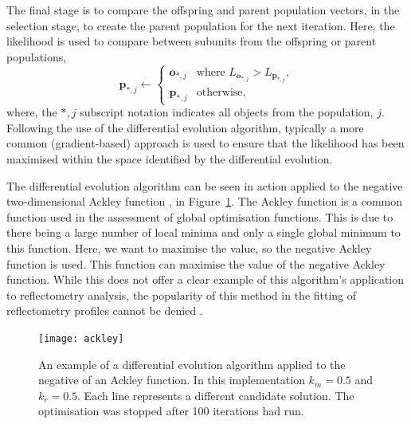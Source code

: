 \documentclass[
 reprint,
 superscriptaddress,
 amsmath,amssymb,
 aps,
]{revtex4-1}
\begin{document}
The final stage is to compare the offspring and parent population vectors, in the selection stage, to create the parent population for the next iteration.
Here, the likelihood is used to compare between subunits from the offspring or parent populations,
%
\begin{equation}
    \mathbf{p}_{*, j} \leftarrow
    \begin{cases}
        \mathbf{o}_{*, j} & \text{where } L_{\mathbf{o}_{*, j}} > L_{\mathbf{p}_{*, j}},\\
        \mathbf{p}_{*, j} & \text{otherwise},
    \end{cases}
\end{equation}
%
where, the $*, j$ subscript notation indicates all objects from the population, $j$.
Following the use of the differential evolution algorithm, typically a more common (gradient-based) approach is used to ensure that the likelihood has been maximised within the space identified by the differential evolution.

The differential evolution algorithm can be seen in action applied to the negative two-dimensional Ackley function \cite{ackley_connectionist_1987}, in Figure~\ref{fig:ackley}.
The Ackley function is a common function used in the assessment of global optimisation functions. This is due to there being a large number of local minima and only a single global minimum to this function. Here, we want to maximise the value, so the negative Ackley function is used.
This function can maximise the value of the negative Ackley function.
While this does not offer a clear example of this algorithm's application to reflectometry analysis, the popularity of this method in the fitting of reflectometry profiles cannot be denied \cite{bjorck_fitting_2011,nelson_refnx_2019}.
%
\begin{figure}[t]
    \texttt{[image: ackley]}
    \caption{An example of a differential evolution algorithm applied to the negative of an Ackley function. In this implementation $k_m=0.5$ and $k_r=0.5$. Each line represents a different candidate solution. The optimisation was stopped after 100 iterations had run.}
    \label{fig:ackley}
\end{figure}
%
\end{document}

